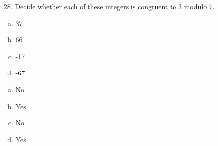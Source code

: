 \begin{itemize}
    \item[28.] Decide whether each of these integers is congruent to 3 modulo 7.
          \begin{enumerate}[a.]
              \item 37
              \item 66
              \item -17
              \item -67
          \end{enumerate}
          \answer
          \begin{enumerate}[a.]
              \item No
              \item Yes
              \item No
              \item Yes
          \end{enumerate}
\end{itemize}

